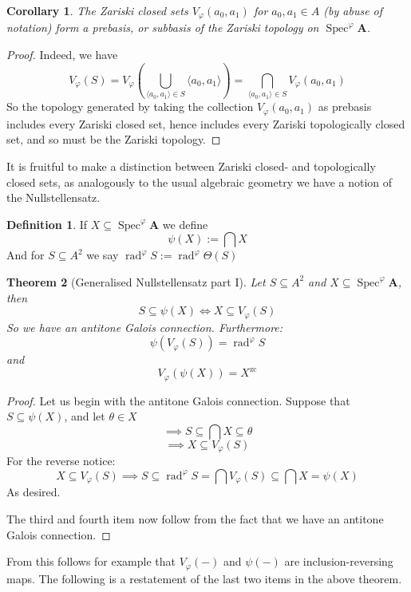 \documentclass{article}
\theoremstyle{plain}
\newtheorem{theorem}{Theorem}[section]
\newtheorem{corollary}[theorem]{Corollary}
\theoremstyle{definition}
\newtheorem{definition}{Definition}[section]
\newcommand{\Spec}{\operatorname{Spec}}
\newcommand{\rad}{\operatorname{rad}}
\begin{document}
\begin{corollary} \label{cor:principalclosedsets}
    The Zariski closed sets $V_\varphi(a_0, a_1)$ for $a_0, a_1 \in A$ (by abuse of notation) form a prebasis, or subbasis of the Zariski topology on $\Spec^\varphi\mathbf{A}$.
\end{corollary}
\begin{proof}
    Indeed, we have
    $$V_\varphi(S) = V_\varphi(\bigcup_{\langle a_0, a_1\rangle \in S} \langle a_0, a_1\rangle) = \bigcap_{\langle a_0, a_1\rangle \in S}V_\varphi(a_0, a_1)$$
    So the topology generated by taking the collection $V_\varphi(a_0, a_1)$ as prebasis includes every Zariski closed set, hence includes every Zariski topologically closed set, and so must be the Zariski topology.
\end{proof}

It is fruitful to make a distinction between Zariski closed- and topologically closed sets, as analogously to the usual algebraic geometry we have a notion of the Nullstellensatz.

\begin{definition}
    If $X \subseteq \Spec^\varphi\mathbf{A}$ we define
    $$\psi(X) := \bigcap X$$
    And for $S \subseteq A^2$ we say $\rad^\varphi S := \rad^\varphi \Theta(S)$
\end{definition}

\begin{theorem}
    [Generalised Nullstellensatz part I]
    Let $S \subseteq A^2$ and $X \subseteq \Spec^\varphi \mathbf{A}$, then
    $$S \subseteq \psi(X) \iff X \subseteq V_\varphi(S)$$
    So we have an antitone Galois connection.
    Furthermore:
    $$\psi(V_\varphi(S)) = \rad^\varphi S$$
    and
    $$V_\varphi(\psi(X)) = X^\text{zc}$$
\end{theorem}
\begin{proof}
    Let us begin with the antitone Galois connection.
    Suppose that $S \subseteq \psi(X)$, and let $\theta \in X$
    $$\implies S\subseteq \bigcap X \subseteq \theta$$
    $$\implies X \subseteq V_\varphi(S)$$
    For the reverse notice:
    $$X\subseteq V_\varphi(S) \implies S \subseteq \rad^\varphi S = \bigcap V_\varphi(S) \subseteq \bigcap X = \psi(X)$$
    As desired.\par
    The third and fourth item now follow from the fact that we have an antitone Galois connection.
\end{proof}

From this follows for example that $V_\varphi(-)$ and $\psi(-)$ are inclusion-reversing maps.
The following is a restatement of the last two items in the above theorem.
\end{document}
